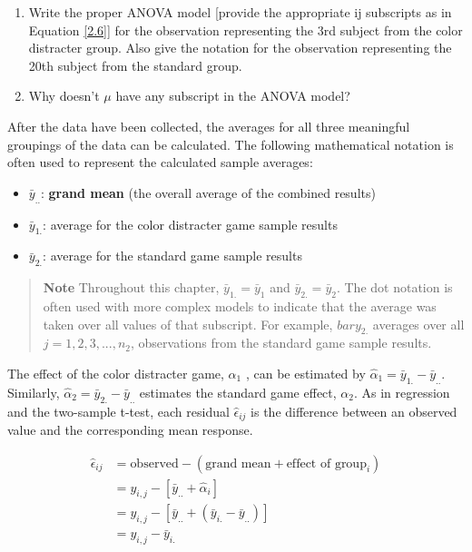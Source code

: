 \documentclass[
]{report}
\providecommand{\tightlist}{%
  \setlength{\itemsep}{0pt}\setlength{\parskip}{0pt}}
\begin{document}
\begin{enumerate}
\def\labelenumi{\arabic{enumi}.}
\setcounter{enumi}{16}
\item
  Write the proper ANOVA model {[}provide the appropriate ij subscripts as in Equation \ref{2.6}{]} for the observation representing the 3rd subject from the color distracter group. Also give the notation for the observation representing the 20th subject from the standard group.
\item
  Why doesn't \(\mu\) have any subscript in the ANOVA model?
\end{enumerate}

After the data have been collected, the averages for all three meaningful groupings of the data can be calculated. The following mathematical notation is often used to represent the calculated sample averages:

\begin{itemize}
\tightlist
\item
  \(\bar{y}_{..}\): \textbf{grand mean} (the overall average of the combined results)
\item
  \(\bar{y}_{1.}\): average for the color distracter game sample results
\item
  \(\bar{y}_{2.}\): average for the standard game sample results
\end{itemize}

\begin{quote}
\textbf{Note}
Throughout this chapter, \(\bar{y}_{1.} = \bar{y}_{1}\) and \(\bar{y}_{2.} = \bar{y}_{2}\). The dot notation is often used with more complex models
to indicate that the average was taken over all values of that subscript. For example, \(bar{y}_{2.}\) averages over all
\(j = 1, 2, 3, ... , n_2\), observations from the standard game sample results.
\end{quote}

The effect of the color distracter game, \(\alpha_1\) , can be estimated by \(\hat{\alpha}_1 = \bar{y}_{1.} - \bar{y}_{..}\). Similarly, \(\hat{\alpha}_2 = \bar{y}_{2.} - \bar{y}_{..}\)
estimates the standard game effect, \(\alpha_2\). As in regression and the two-sample t-test, each residual \(\hat{\epsilon}_{ij}\) is the
difference between an observed value and the corresponding mean response.

\[
\begin{aligned}
\hat{\epsilon}_{ij}  
  &= \text{observed} - (\text{grand mean} + \text{effect of group}_i)\\
  &= y_{i,j} - [\bar{y}_{..} + \hat{\alpha}_i]\\
  &= y_{i,j} - [\bar{y}_{..} + (\bar{y}_{i.} - \bar{y}_{..})]\\
  &= y_{i,j} - \bar{y}_{i.}\\
\end{aligned}  
\]
\end{document}
